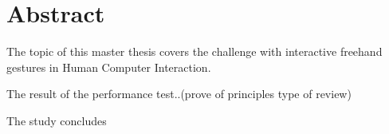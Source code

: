\chapter*{Abstract}
The topic of this master thesis covers the challenge with interactive freehand gestures in Human Computer Interaction.


The result of the performance test..(prove of principles type of review)

The study concludes







\hypersetup{pageanchor=false}